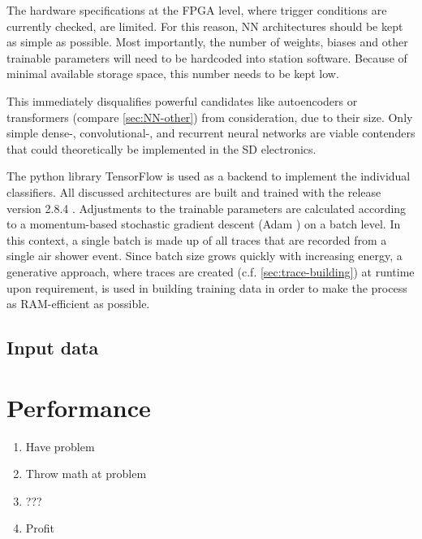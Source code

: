 The hardware specifications at the FPGA level, where trigger conditions are currently checked, are limited. For this reason, NN architectures should be kept as 
simple as possible. Most importantly, the number of weights, biases and other trainable parameters will need to be hardcoded into station software. Because of 
minimal available storage space, this number needs to be kept low.

This immediately disqualifies powerful candidates like autoencoders or transformers (compare \autoref{sec:NN-other}) from consideration, due to their size. Only 
simple dense-, convolutional-, and recurrent neural networks are viable contenders that could theoretically be implemented in the SD electronics.

The python library TensorFlow \cite{tensorflow2015-whitepaper} is used as a backend to implement the individual classifiers. All discussed architectures are built 
and trained with the release version 2.8.4 \cite{tensorflowversion}. Adjustments to the trainable parameters are calculated according to a momentum-based 
stochastic gradient descent (Adam \cite{kingma2014adam}) on a batch level. In this context, a single batch is made up of all traces that are recorded from a single 
air shower event. Since batch size grows quickly with increasing energy, a generative approach, where traces are created (c.f. \autoref{sec:trace-building}) at 
runtime upon requirement, is used in building training data in order to make the process as RAM-efficient as possible.


\subsection{Input data}
\label{ssec:input-data}



\section{Performance}

\begin{enumerate}
    \item Have problem
    \item Throw math at problem
    \item ???
    \item Profit
\end{enumerate}

